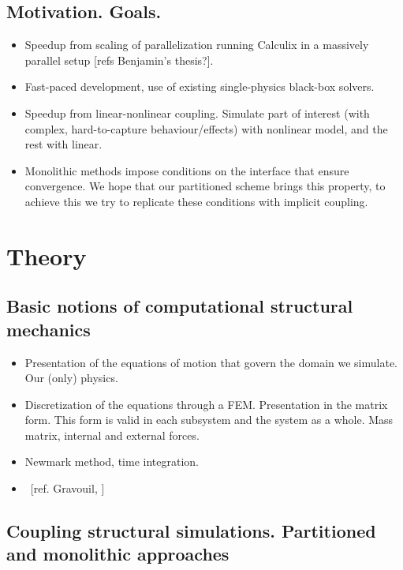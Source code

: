 \documentclass[a4paper, 11pt, oneside]{Thesis}  %
\begin{document}
    \section{Motivation. Goals.}
    
        \begin{itemize}
            \item Speedup from scaling of parallelization running Calculix in a massively parallel setup [refs Benjamin's thesis?].
            \item Fast-paced development, use of existing single-physics black-box solvers.
            \item Speedup from linear-nonlinear coupling. Simulate part of interest (with complex, hard-to-capture behaviour/effects) with nonlinear model, and the rest with linear.
            \item Monolithic methods impose conditions on the interface that ensure convergence. We hope that our partitioned scheme brings this property, to achieve this we try to replicate these conditions with implicit coupling.
        \end{itemize}


\chapter{Theory}

    \section{Basic notions of computational structural mechanics}
    
        \begin{itemize}
            \item Presentation of the equations of motion that govern the domain we simulate.  Our (only) physics.
            \item Discretization of the equations through a FEM. Presentation in the matrix form. This form is valid in each subsystem and the system as a whole. Mass matrix, internal and external forces.
            \item Newmark method, time integration.
            \item ~[ref. Gravouil, ]
        \end{itemize}
    
    \section{Coupling structural simulations. Partitioned and monolithic approaches}
    
\end{document}

